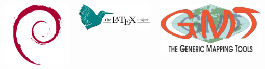 \begin{frame}
\begin{columns}
        \vspace{7ex}
        \includegraphics[width=\linewidth]{Assets/debian-logo.png}

        \includegraphics[width=\linewidth]{Assets/latex-project-logo.pdf}

        \vspace{3ex}

        \includegraphics[width=\linewidth]{Assets/GMT_logo.png}
    \end{columns}
\end{frame}
